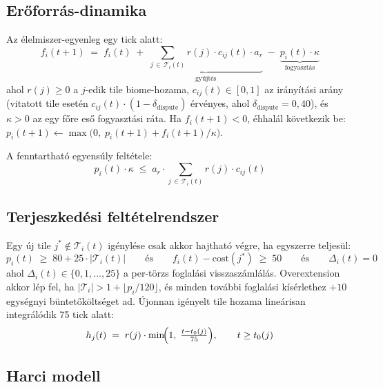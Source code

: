 \subsection*{Erőforrás-dinamika}

Az élelmiszer-egyenleg egy tick alatt:
\begin{equation}
f_i(t+1) \;=\; f_i(t)
\;+\; \underbrace{\sum_{j \,\in\, \mathcal{T}_i(t)} r(j)\cdot c_{ij}(t)\cdot a_r}_{\text{gyűjtés}}
\;-\; \underbrace{p_i(t)\cdot\kappa}_{\text{fogyasztás}}
\end{equation}
ahol $r(j) \geq 0$ a $j$-edik tile biome-hozama, $c_{ij}(t) \in [0,1]$ az irányítási arány
(vitatott tile esetén $c_{ij}(t)\cdot(1 - \delta_{\text{dispute}})$ érvényes, ahol
$\delta_{\text{dispute}} = 0{,}40$), és $\kappa > 0$ az egy főre eső fogyasztási ráta.
Ha $f_i(t+1) < 0$, éhhalál következik be: $p_i(t+1) \leftarrow \max\bigl(0,\; p_i(t+1) + f_i(t+1)/\kappa\bigr)$.

A fenntartható egyensúly feltétele:
\begin{equation}
p_i(t)\cdot\kappa \;\leq\; a_r \cdot \sum_{j \,\in\, \mathcal{T}_i(t)} r(j)\cdot c_{ij}(t)
\end{equation}

\subsection*{Terjeszkedési feltételrendszer}

Egy új tile $j^* \notin \mathcal{T}_i(t)$ igénylése csak akkor hajtható végre, ha egyszerre
teljesül:
\begin{equation}
p_i(t) \;\geq\; 80 + 25\cdot|\mathcal{T}_i(t)|
\qquad \text{és} \qquad
f_i(t) - \mathrm{cost}(j^*) \;\geq\; 50
\qquad \text{és} \qquad
\Delta_i(t) = 0
\end{equation}
ahol $\Delta_i(t) \in \{0,1,\ldots,25\}$ a per-törzs foglalási visszaszámlálás. Overextension
akkor lép fel, ha $|\mathcal{T}_i| > 1 + \lfloor p_i/120 \rfloor$, és minden további
foglalási kísérlethez $+10$ egységnyi büntetőköltséget ad. Újonnan igényelt tile hozama
lineárisan integrálódik 75 tick alatt:
\begin{equation}
h_j(t) \;=\; r(j)\cdot\min\!\Bigl(1,\;\tfrac{t - t_0(j)}{75}\Bigr), \qquad t \geq t_0(j)
\end{equation}

\subsection*{Harci modell}

